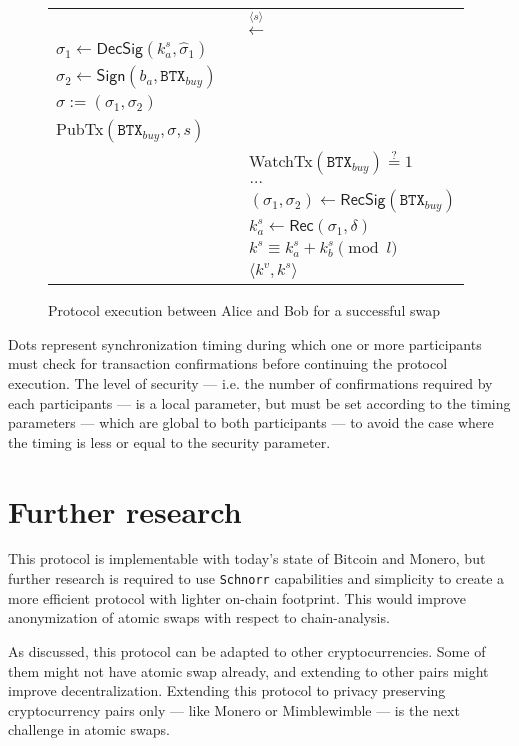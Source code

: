 \documentclass{llncs}
\newcommand{\BTX}{\texttt{BTX}}
\newcommand{\DecSig}{\textsf{DecSig}}
\newcommand{\Sign}{\textsf{Sign}}
\newcommand{\Rec}{\textsf{Rec}}
\newcommand{\hatsigma}{\hat{\sigma}}
\newcommand{\PubTx}{\textsf{PubTx}}
\newcommand{\WatchTx}{\textsf{WatchTx}}
\newcommand{\RecSig}{\textsf{RecSig}}
\begin{document}
\begin{figure}[H]
\begin{table}[H]
{\begin{tabular}{ | l c l | }
          \multicolumn{3}{|c|}{$\xleftarrow{\langle s \rangle}$} \\

          $\sigma_1 \gets \DecSig(k^s_a, \hatsigma_1)$ & & \\
          $\sigma_2 \gets \Sign(b_a, \BTX_\textit{buy})$ & & \\
          $\sigma := (\sigma_1, \sigma_2)$ & & \\
          \PubTx$(\BTX_\textit{buy}, \sigma, s)$ & & \\

          & & \WatchTx$(\BTX_\textit{buy}) \stackrel{?}{=} 1$ \\
          \multicolumn{3}{|c|}{$\dots$} \\

          & & $(\sigma_1, \sigma_2) \gets \RecSig(\BTX_\textit{buy})$ \\
          & & $k^s_a \gets \Rec(\sigma_1, \delta)$ \\
          & & $k^s \equiv k^s_a + k^s_b \pmod l$ \\
          & & $\langle k^v, k^s \rangle$ \\
        \hline
      \end{tabular}}
    \end{table}
  \caption{Protocol execution between Alice and Bob for a successful swap}
  \label{fig:protocol}
\end{figure}

Dots represent synchronization timing during which one or more participants must check for transaction confirmations before continuing the protocol execution. The level of security --- i.e. the number of confirmations required by each participants --- is a local parameter, but must be set according to the timing parameters --- which are global to both participants --- to avoid the case where the timing is less or equal to the security parameter.

\section{Further research}
This protocol is implementable with today's state of Bitcoin and Monero, but further research is required to use \texttt{Schnorr} capabilities and simplicity to create a more efficient protocol with lighter on-chain footprint. This would improve anonymization of atomic swaps with respect to chain-analysis.

As discussed, this protocol can be adapted to other cryptocurrencies. Some of them might not have atomic swap already, and extending to other pairs might improve decentralization. Extending this protocol to privacy preserving cryptocurrency pairs only --- like Monero or Mimblewimble --- is the next challenge in atomic swaps.
\end{document}
